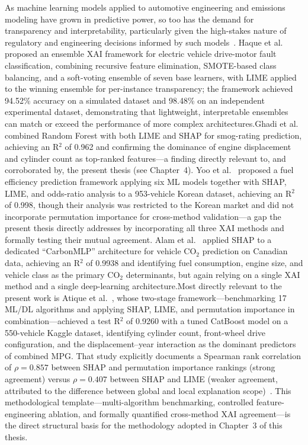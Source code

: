 As machine learning models applied to automotive engineering and emissions modeling have grown in predictive power, so too has the demand for transparency and interpretability, particularly given the high-stakes nature of regulatory and engineering decisions informed by such models~\cite{minh2022explainable}\cite{hassija2024interpreting}\cite{chen2025need}. Haque et al.~\cite{haque2025ensemblexai} proposed an ensemble XAI framework for electric vehicle drive-motor fault classification, combining recursive feature elimination, SMOTE-based class balancing, and a soft-voting ensemble of seven base learners, with LIME applied to the winning ensemble for per-instance transparency; the framework achieved 94.52\% accuracy on a simulated dataset and 98.48\% on an independent experimental dataset, demonstrating that lightweight, interpretable ensembles can match or exceed the performance of more complex architectures.Ghadi et al.~\cite{ghadi2025explainable} combined Random Forest with both LIME and SHAP for smog-rating prediction, achieving an R$^2$ of 0.962 and confirming the dominance of engine displacement and cylinder count as top-ranked features---a finding directly relevant to, and corroborated by, the present thesis (see Chapter~4). Yoo et al.~\cite{yoo2025machine} proposed a fuel efficiency prediction framework applying six ML models together with SHAP, LIME, and odds-ratio analysis to a 953-vehicle Korean dataset, achieving an R$^2$ of 0.998, though their analysis was restricted to the Korean market and did not incorporate permutation importance for cross-method validation---a gap the present thesis directly addresses by incorporating all three XAI methods and formally testing their mutual agreement. Alam et al.~\cite{alam2025deep}\cite{hamed2021fuel} applied SHAP to a dedicated ``CarbonMLP'' architecture for vehicle CO$_2$ prediction on Canadian data, achieving an R$^2$ of 0.9938 and identifying fuel consumption, engine size, and vehicle class as the primary CO$_2$ determinants, but again relying on a single XAI method and a single deep-learning architecture.Most directly relevant to the present work is Atique et al.~\cite{atique2026explainable}, whose two-stage framework---benchmarking 17 ML/DL algorithms and applying SHAP, LIME, and permutation importance in combination---achieved a test R$^2$ of 0.9260 with a tuned CatBoost model on a 550-vehicle Kaggle dataset, identifying cylinder count, front-wheel drive configuration, and the displacement--year interaction as the dominant predictors of combined MPG. That study explicitly documents a Spearman rank correlation of $\rho = 0.857$ between SHAP and permutation importance rankings (strong agreement) versus $\rho = 0.407$ between SHAP and LIME (weaker agreement, attributed to the difference between global and local explanation scope)~\cite{atique2026explainable}. This methodological template---multi-algorithm benchmarking, controlled feature-engineering ablation, and formally quantified cross-method XAI agreement---is the direct structural basis for the methodology adopted in Chapter~3 of this thesis.


